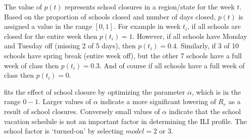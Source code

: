 \documentclass[a4paper]{article}
\begin{document}
The value of $p(t)$ represents school closures in a region/state for the week $t$. Based on the proportion of schools closed and number of days closed, $p(t)$ is assigned a value in the range $[0,1]$.  For example in week $t_i$, if all schools are closed for the entire week then $p(t_i)=1$.  However, if all schools have Monday and Tuesday off (missing 2 of 5 days), then  $p(t_i)=0.4$.  Similarly, if 3 of 10 schools have spring break (entire week off), but the other 7 schools have a full week of class then $p(t_i)=0.3$.  And of course if all schools have a full week of class then $p(t_i)=0$.

 fits the effect of school closure by optimizing the parameter $\alpha$, which is in the range $0-1$.  Larger values of $\alpha$ indicate a more significant lowering of $R_e$ as a result of school closures. Conversely small values of $\alpha$ indicate that the school vacation schedule is not an important factor in determining the ILI profile.   The school factor is `turned-on' by selecting $model= 2$ or $3$.
\end{document}
